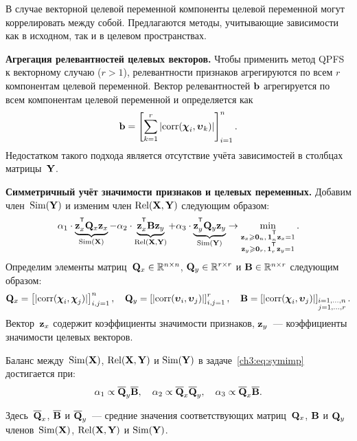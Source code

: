 \documentclass[11pt, a5paper]{dissert}
\begin{document}
В случае векторной целевой переменной компоненты целевой переменной могут коррелировать между собой. 
Предлагаются методы, учитывающие зависимости как в исходном, так и в целевом пространствах.

\textbf{Агрегация релевантностей целевых векторов.}
Чтобы применить метод QPFS к векторному случаю ($r > 1$), релевантности признаков агрегируются по всем $r$ компонентам целевой переменной. 
Вектор релевантностей $\mathbf{b}$ агрегируется по всем компонентам целевой переменной и определяется как
\begin{equation*}
	\mathbf{b} = \left[\sum_{k=1}^r|\text{corr}(\boldsymbol{\chi}_i, \boldsymbol{\upsilon}_k)|\right]_{i=1}^n.
\end{equation*}
Недостатком такого подхода является отсутствие учёта зависимостей в столбцах матрицы~$\mathbf{Y}$. 

\textbf{Симметричный учёт значимости признаков и целевых переменных.}
Добавим член~$\text{Sim}(\mathbf{Y})$ и изменим член $\text{Rel}(\mathbf{X}, \mathbf{Y})$ следующим образом:
\begin{equation}
	\alpha_1 \cdot \underbrace{\bz_x^{\T} \bQ_x \bz_x}_{\text{Sim}(\bX)} - \alpha_2 \cdot \underbrace{\bz_x^{\T} \bB \bz_y}_{\text{Rel}(\bX, \bY)} + \alpha_3 \cdot \underbrace{\bz_y^{\T} \bQ_y \bz_y}_{\text{Sim}(\bY)} \rightarrow \min_{\substack{\bz_x \geq \bZero_n, \, \bOne_n^{\T}\bz_x=1 \\ \bz_y \geq \bZero_r, \, \bOne_r^{\T}\bz_y=1}}.
	\label{ch3:eq:symimp}
\end{equation}
Определим элементы матриц~$\mathbf{Q}_x \in \mathbb{R}^{n \times n}$, $\mathbf{Q}_y \in \mathbb{R}^{r \times r}$ и $\mathbf{B} \in \mathbb{R}^{n \times r}$ следующим образом:
\begin{equation*}
	\mathbf{Q}_x = \left[ |\text{corr}(\boldsymbol{\chi}_i, \boldsymbol{\chi}_j)| \right]_{i,j=1}^n, \quad
	\mathbf{Q}_y = \left[ |\text{corr}(\boldsymbol{\upsilon}_i, \boldsymbol{\upsilon}_j)| \right]_{i,j=1}^r, \quad
	\mathbf{B} =  \left[ |\text{corr}(\boldsymbol{\chi}_i, \boldsymbol{\upsilon}_j)| \right]_{\substack{i=1, \dots, n \\ j=1, \dots, r}}.
\end{equation*}
Вектор~$\mathbf{z}_x$ содержит коэффициенты значимости признаков, $\mathbf{z}_y$~--- коэффициенты значимости целевых векторов.

\begin{statement}
	Баланс между~$\text{Sim}(\mathbf{X})$, $\text{Rel}(\mathbf{X}, \mathbf{Y})$ и $\text{Sim}(\mathbf{Y})$ в  задаче~\eqref{ch3:eq:symimp} достигается при:
	\begin{equation}
	\alpha_1 \propto \overline{\mathbf{Q}}_y \overline{\mathbf{B}}, \quad
	\alpha_2 \propto \overline{\mathbf{Q}}_x \overline{\mathbf{Q}}_y, \quad
	\alpha_3  \propto \overline{\mathbf{Q}}_x \overline{\mathbf{B}}.
	\label{ch3:eq:alpha_3}
	\end{equation}
\end{statement}
Здесь~$\overline{\mathbf{Q}}_x$, $\overline{\mathbf{B}}$ и $\overline{\mathbf{Q}}_y$~--- средние значения соответствующих матриц~$\mathbf{Q}_x$, $\mathbf{B}$ и $\mathbf{Q}_y$ членов~$\text{Sim}(\mathbf{X})$, $\text{Rel}(\mathbf{X}, \mathbf{Y})$ и $\text{Sim}(\mathbf{Y})$.
\end{document}
